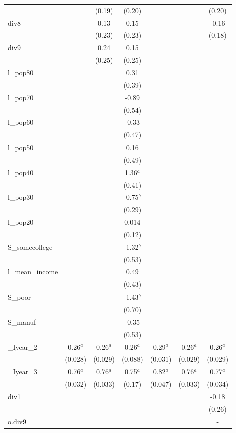 \documentclass[]{article}
\begin{document}
\begin{tabular}{lcccccc}
 &  & (0.19) & (0.20) &  &  & (0.20) \\
div8 &  & 0.13 & 0.15 &  &  & -0.16 \\
 &  & (0.23) & (0.23) &  &  & (0.18) \\
div9 &  & 0.24 & 0.15 &  &  &  \\
 &  & (0.25) & (0.25) &  &  &  \\
l\_pop80 &  &  & 0.31 &  &  &  \\
 &  &  & (0.39) &  &  &  \\
l\_pop70 &  &  & -0.89 &  &  &  \\
 &  &  & (0.54) &  &  &  \\
l\_pop60 &  &  & -0.33 &  &  &  \\
 &  &  & (0.47) &  &  &  \\
l\_pop50 &  &  & 0.16 &  &  &  \\
 &  &  & (0.49) &  &  &  \\
l\_pop40 &  &  & 1.36$^a$ &  &  &  \\
 &  &  & (0.41) &  &  &  \\
l\_pop30 &  &  & -0.75$^b$ &  &  &  \\
 &  &  & (0.29) &  &  &  \\
l\_pop20 &  &  & 0.014 &  &  &  \\
 &  &  & (0.12) &  &  &  \\
S\_somecollege &  &  & -1.32$^b$ &  &  &  \\
 &  &  & (0.53) &  &  &  \\
l\_mean\_income &  &  & 0.49 &  &  &  \\
 &  &  & (0.43) &  &  &  \\
S\_poor &  &  & -1.43$^b$ &  &  &  \\
 &  &  & (0.70) &  &  &  \\
S\_manuf &  &  & -0.35 &  &  &  \\
 &  &  & (0.53) &  &  &  \\
\_Iyear\_2 & 0.26$^a$ & 0.26$^a$ & 0.26$^a$ & 0.29$^a$ & 0.26$^a$ & 0.26$^a$ \\
 & (0.028) & (0.029) & (0.088) & (0.031) & (0.029) & (0.029) \\
\_Iyear\_3 & 0.76$^a$ & 0.76$^a$ & 0.75$^a$ & 0.82$^a$ & 0.76$^a$ & 0.77$^a$ \\
 & (0.032) & (0.033) & (0.17) & (0.047) & (0.033) & (0.034) \\
div1 &  &  &  &  &  & -0.18 \\
 &  &  &  &  &  & (0.26) \\
o.div9 &  &  &  &  &  & - \\

\end{tabular}
\end{document}
